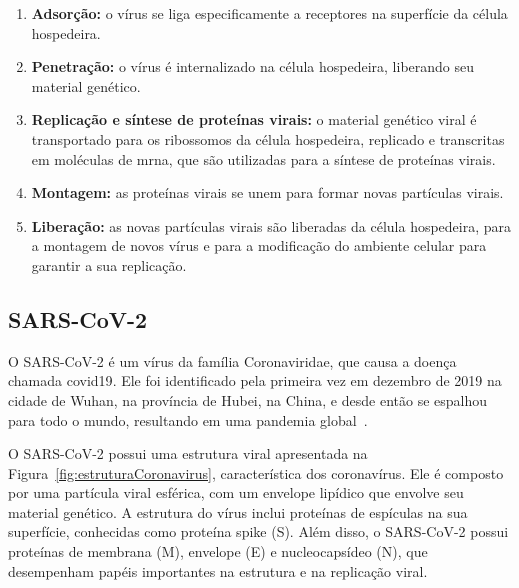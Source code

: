 \begin{enumerate}
  \item \textbf{Adsorção:} o vírus se liga especificamente a receptores na superfície da célula hospedeira.
  \item \textbf{Penetração:} o vírus é internalizado na célula hospedeira, liberando seu material genético.
  \item \textbf{Replicação e síntese de proteínas virais:} o material genético viral é transportado para os ribossomos da célula hospedeira, replicado e transcritas em moléculas de \gls{mrna}, que são utilizadas para a síntese de proteínas virais.
  \item \textbf{Montagem:} as proteínas virais se unem para formar novas partículas virais.
  \item \textbf{Liberação:} as novas partículas virais são liberadas da célula hospedeira, para a montagem de novos vírus e para a modificação do ambiente celular para garantir a sua replicação.
\end{enumerate}

\subsection{SARS-CoV-2}

O SARS-CoV-2 é um vírus da família Coronaviridae, que causa a doença chamada \gls{covid19}. Ele foi identificado pela primeira vez em dezembro de 2019 na cidade de Wuhan, na província de Hubei, na China, e desde então se espalhou para todo o mundo, resultando em uma pandemia global~\cite{zhu_novel_2020,wu_coronavirus_2020}.

O SARS-CoV-2 possui uma estrutura viral apresentada na Figura~\ref{fig:estruturaCoronavirus}, característica dos coronavírus. Ele é composto por uma partícula viral esférica, com um envelope lipídico que envolve seu material genético. A estrutura do vírus inclui proteínas de espículas na sua superfície, conhecidas como proteína spike (S). Além disso, o SARS-CoV-2 possui proteínas de membrana (M), envelope (E) e nucleocapsídeo (N), que desempenham papéis importantes na estrutura e na replicação viral.

